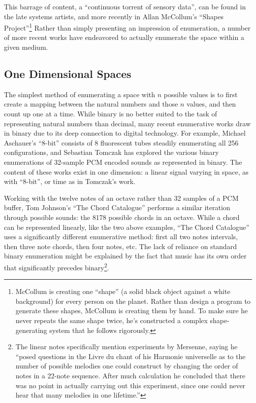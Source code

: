 \documentclass{thesis}
\begin{document}
This barrage of content, a ``continuous torrent of sensory data'', can be found in the late systems artists\cite{Wright09}, and more recently in Allan McCollum's ``Shapes Project''\cite{allan_mccollum_shapes_2006}\footnote{McCollum is creating one ``shape'' (a solid black object against a white background) for every person on the planet. Rather than design a program to generate these shapes, McCollum is creating them by hand. To make sure he never repeats the same shape twice, he's constructed a complex shape-generating system that he follows rigorously.} Rather than simply presenting an impression of enumeration, a number of more recent works have endeavored to actually enumerate the space within a given medium.

\subsection{One Dimensional Spaces}

The simplest method of enumerating a space with $n$ possible values is to first create a mapping between the natural numbers and those $n$ values, and then count up one at a time. While binary is no better suited to the task of representing natural numbers than decimal, many recent enumerative works draw in binary due to its deep connection to digital technology. For example, Michael Aschauer's ``8-bit''\cite{michael_aschauer_8-bit_????} consists of 8 fluorescent tubes steadily enumerating all 256 configurations, and Sebastian Tomczak\cite{tomczak_hardware-based_2009}\cite{tomczak_all_2009} has explored the various binary enumerations of 32-sample PCM encoded sounds as represented in binary. The content of these works exist in one dimension: a linear signal varying in space, as with ``8-bit'', or time  as in Tomczak's work.
	
Working with the twelve notes of an octave rather than 32 samples of a PCM buffer, Tom Johnson's ``The Chord Catalogue''\cite{tom_johnson_liner_1999} performs a similar iteration through possible sounds: the 8178 possible chords in an octave. While a chord can be represented linearly, like the two above examples, ``The Chord Catalogue'' uses a significantly different enumerative method: first all two notes intervals, then three note chords, then four notes, etc. The lack of reliance on standard binary enumeration might be explained by the fact that music has its own order that significantly precedes binary\footnote{The linear notes specifically mention experiments by Mersenne, saying he ``posed questions in the Livre du chant of his Harmonie universelle as to the number of possible melodies one could construct by changing the order of notes in a 22-note sequence. After much calculation he concluded that there was no point in actually carrying out this experiment, since one could never hear that many melodies in one lifetime.''}.
\end{document}
